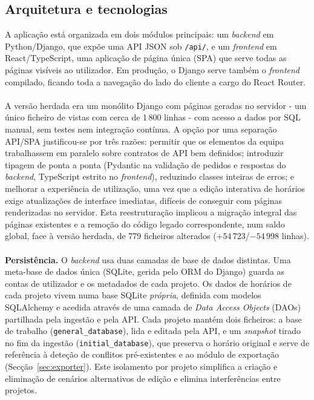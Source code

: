 \documentclass[10pt]{article}
\begin{document}
\subsection{Arquitetura e tecnologias}

    A aplicação está organizada em dois módulos principais: um \emph{backend} em Python/Django, que expõe uma API JSON sob \texttt{/api/}, e um \emph{frontend} em React/TypeScript, uma aplicação de página única (SPA) que serve todas as páginas visíveis ao utilizador. Em produção, o Django serve também o \emph{frontend} compilado, ficando toda a navegação do lado do cliente a cargo do React Router.
    \\\\
    A versão herdada era um monólito Django com páginas geradas no servidor - um único ficheiro de vistas com cerca de 1\,800 linhas - com acesso a dados por SQL manual, sem testes nem integração contínua. A opção por uma separação API/SPA justificou-se por três razões: permitir que os elementos da equipa trabalhassem em paralelo sobre contratos de API bem definidos; introduzir tipagem de ponta a ponta (Pydantic na validação de pedidos e respostas do \emph{backend}, TypeScript estrito no \emph{frontend}), reduzindo classes inteiras de erros; e melhorar a experiência de utilização, uma vez que a edição interativa de horários exige atualizações de interface imediatas, difíceis de conseguir com páginas renderizadas no servidor. Esta reestruturação implicou a migração integral das páginas existentes e a remoção do código legado correspondente, num saldo global, face à versão herdada, de 779 ficheiros alterados ($+54\,723$/$-54\,998$ linhas).
    \\\\
    \textbf{Persistência.} O \emph{backend} usa duas camadas de base de dados distintas. Uma meta-base de dados única (SQLite, gerida pelo ORM do Django) guarda as contas de utilizador e os metadados de cada projeto. Os dados de horários de cada projeto vivem numa base SQLite \emph{própria}, definida com modelos SQLAlchemy e acedida através de uma camada de \emph{Data Access Objects} (DAOs) partilhada pela ingestão e pela API. Cada projeto mantém dois ficheiros: a base de trabalho (\texttt{general\_database}), lida e editada pela API, e um \emph{snapshot} tirado no fim da ingestão (\texttt{initial\_database}), que preserva o horário original e serve de referência à deteção de conflitos pré-existentes e ao módulo de exportação (Secção~\ref{sec:exporter}). Este isolamento por projeto simplifica a criação e eliminação de cenários alternativos de edição e elimina interferências entre projetos.
\end{document}
